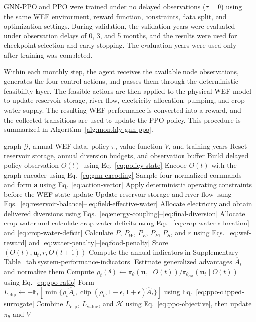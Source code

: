 \documentclass [a4paper,fleqn] {cas-dc}
\begin{document}
GNN-PPO and PPO were trained under no delayed observations ($\tau=0$) using the same WEF environment, reward function, constraints, data split, and optimization settings. During validation, the validation years were evaluated under observation delays of 0, 3, and 5 months, and the results were used for checkpoint selection and early stopping. The evaluation years were used only after training was completed.

Within each monthly step, the agent receives the available node observations, generates the four control actions, and passes them through the deterministic feasibility layer. The feasible actions are then applied to the physical WEF model to update reservoir storage, river flow, electricity allocation, pumping, and crop-water supply. The resulting WEF performance is converted into a reward, and the collected transitions are used to update the PPO policy. This procedure is summarized in Algorithm~\ref{alg:monthly-gnn-ppo}.

\begin{algorithm}[H] \caption{Monthly GNN-PPO training and WEF execution} \label{alg:monthly-gnn-ppo} \scriptsize \begin{algorithmic}[1] \Require graph $\mathcal G$, annual WEF data, policy $\pi$, value function $V$, and training years   \State Reset reservoir storage, annual diversion budgets, and observation buffer  \State Build delayed policy observation $O(t)$ using Eq.~\eqref{eq:policy-state} \State Encode $O(t)$ with the graph encoder using Eq.~\eqref{eq:gnn-encoding} \State Sample four normalized commands and form $\mathbf a$ using Eq.~\eqref{eq:action-vector} \State Apply deterministic operating constraints before the WEF state update \State Update reservoir storage and river flow using Eqs.~\eqref{eq:reservoir-balance}--\eqref{eq:field-effective-water} \State Allocate electricity and obtain delivered diversions using Eqs.~\eqref{eq:energy-coupling}--\eqref{eq:final-diversion} \State Allocate crop water and calculate crop-water deficits using Eqs.~\eqref{eq:crop-water-allocation} and \eqref{eq:crop-water-deficit} \State Calculate $P$, $P_W$, $P_E$, $P_F$, $P_S$, and $r$ using Eqs.~\eqref{eq:wef-reward} and \eqref{eq:water-penalty}--\eqref{eq:food-penalty} \State Store $(O(t),\mathbf u_t,r,O(t+1))$ \EndFor \State Compute the annual indicators in Supplementary Table~\ref{tab:system-performance-indicators} \EndFor \State Estimate generalized advantages $\hat A_t$ and normalize them \State Compute $\rho_t(\theta)\gets\pi_\theta(\mathbf u_t\mid O(t))/\pi_{\theta_{\mathrm{old}}}(\mathbf u_t\mid O(t))$ using Eq.~\eqref{eq:ppo-ratio} \State Form $L_{\mathrm{clip}}\gets-\mathbb E_t[\min\{\rho_t\hat A_t,\operatorname{clip}(\rho_t,1-\epsilon,1+\epsilon)\hat A_t\}]$ using Eq.~\eqref{eq:ppo-clipped-surrogate} \State Combine $L_{\mathrm{clip}}$, $L_{\mathrm{value}}$, and $\mathcal H$ using Eq.~\eqref{eq:ppo-objective}, then update $\pi_\theta$ and $V$ \EndFor \end{algorithmic} \end{algorithm}
\end{document}
